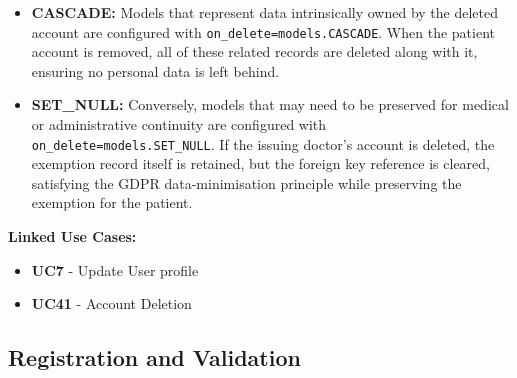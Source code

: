 \begin{itemize}
    \item \textbf{CASCADE:} Models that represent data intrinsically owned by the deleted account are configured with \texttt{on\_delete=models.CASCADE}. When the patient account is removed, all of these related records are deleted along with it, ensuring no personal data is left behind.
    \item \textbf{SET\_NULL:} Conversely, models that may need to be preserved for medical or administrative continuity are configured with \texttt{on\_delete=models.SET\_NULL}. If the issuing doctor's account is deleted, the exemption record itself is retained, but the foreign key reference is cleared, satisfying the GDPR data-minimisation principle while preserving the exemption for the patient.
\end{itemize}

\vspace{0.5cm}
\noindent\textbf{Linked Use Cases:}
\begin{itemize}
    \item \textbf{UC7} - Update User profile
    \item \textbf{UC41} - Account Deletion
\end{itemize}



\subsection{Registration and Validation}


